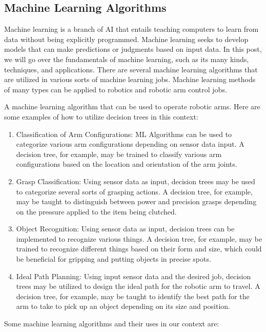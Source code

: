 \documentclass[12pt,oneside]{article}
\begin{document}
\subsection{Machine Learning Algorithms}
Machine learning is a branch of AI that entails teaching computers to learn from data without being explicitly programmed. Machine learning seeks to develop models that can make predictions or judgments based on input data. In this post, we will go over the fundamentals of machine learning, such as its many kinds, techniques, and applications. 
There are several machine learning algorithms that are utilized in various sorts of machine learning jobs. Machine learning methods of many types can be applied to robotics and robotic arm control jobs. 

A machine learning algorithm that can be used to operate robotic arms. Here are some examples of how to utilize decision trees in this context:
    \begin{enumerate}
    \item Classification of Arm Configurations: ML Algorithms can be used to categorize various arm configurations depending on sensor data input. A decision tree, for example, may be trained to classify various arm configurations based on the location and orientation of the arm joints.
    \item Grasp Classification: Using sensor data as input, decision trees may be used to categorize several sorts of grasping actions. A decision tree, for example, may be taught to distinguish between power and precision grasps depending on the pressure applied to the item being clutched.
    \item Object Recognition: Using sensor data as input, decision trees can be implemented to recognize various things. A decision tree, for example, may be trained to recognize different things based on their form and size, which could be beneficial for gripping and putting objects in precise spots.
    \item Ideal Path Planning: Using input sensor data and the desired job, decision trees may be utilized to design the ideal path for the robotic arm to travel. A decision tree, for example, may be taught to identify the best path for the arm to take to pick up an object depending on its size and position.
    \end{enumerate}
Some machine learning algorithms and their uses in our context are:
\end{document}
